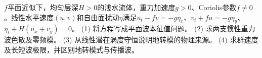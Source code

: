 \(f\)平面近似下，均匀层深\(H>0\)的浅水流体，重力加速度\(g>0\)、Coriolis参数\(f\ne0\)。线性水平速度\((u,v)\)和自由面扰动\(\eta\)满足\(u_t-fv=-g\eta_x\)、\(v_t+fu=-g\eta_y\)、\(\eta_t+H(u_x+v_y)=0\)。
(1) 将方程写成平面波本征值问题。
(2) 求两支惯性重力波色散及零频模。
(3) 从线性潜在涡度守恒说明地转模的物理来源。
(4) 求群速度及长短波极限，并区别地转模式与传播波。

